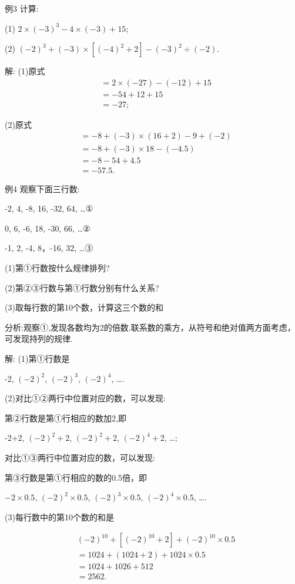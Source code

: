 \documentclass{article}
\begin{document}
\begin{example}

例3 计算:

(1) $2\times(-3)^3-4\times(-3)+15$;

(2) $(-2)^3+(-3)\times[(-4)^2+2]-(-3)^2\div(-2)$.

解: (1)原式\begin{align}
        &=2\times(-27)-(-12)+15 \\
        &=-54+12+15     \\
        &=-27;
\end{align}

(2)原式\begin{align}
    &=-8+(-3)\times(16+2)-9+(-2) \\
    &=-8+(-3)\times18-(-4.5) \\
    &=-8-54+4.5 \\
    &=-57.5.
    \end{align}

例4 观察下面三行数:

-2, 4, -8, 16, -32, 64, \dots ①

0, 6, -6, 18, -30, 66, \dots  ②

-1, 2, -4, 8，-16, 32, \dots  ③

(1)第①行数按什么规律排列?

(2)第②③行数与第①行数分别有什么关系?

(3)取每行数的第10个数，计算这三个数的和

分析:观察①,发现各数均为2的倍数.联系数的乘方，从符号和绝对值两方面考虑，可发现持列的规律.

解: (1)第①行数是

-2, $(-2)^2$, $(-2)^3$, $(-2)^4$, \dots.

(2)对比①②两行中位置对应的数，可以发现:

第②行数是第①行相应的数加2,即

-2+2, $(-2)^2+2$,  $(-2)^2+2$, $(-2)^4+2$, \dots;

对比①③两行中位置对应的数，可以发现:

第③行数是第①行相应的数的0.5倍，即

$-2\times0.5$, $(-2)^2\times0.5$, $(-2)^3\times0.5$, $(-2)^4\times0.5$, \dots.

(3)每行数中的第10个数的和是

\begin{align}
    &(-2)^{10}+[(-2)^{10}+2]+(-2)^{10}\times0.5 \\
    &=1024+(1024+2)+1024\times0.5 \\
    &=1024+1026+512 \\
    &=2562.
\end{align}


\end{example}
\end{document}
